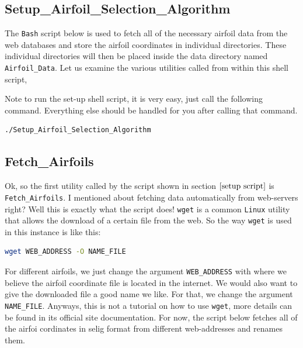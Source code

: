 \subsection{Setup\_Airfoil\_Selection\_Algorithm} \label{setup script}

The \texttt{Bash} script below is used to fetch all of the necessary airfoil data from the web databases and store the airfoil coordinates in individual directories. These individual directories will then be placed inside the data directory named \texttt{Airfoil\_Data}. Let us examine the various utilities called from within this shell script, 

$$$$
Note to run the set-up shell script, it is very easy, just call the following command. Everything else should be handled for you after calling that command.
\begin{lstlisting}
./Setup_Airfoil_Selection_Algorithm
\end{lstlisting}

\subsection{Fetch\_Airfoils}

Ok, so the first utility called by the script shown in section $\ref{setup script}$ is \texttt{Fetch\_Airfoils}. I mentioned about fetching data automatically from web-servers right? Well this is exactly what the script does! \texttt{wget} is a common \texttt{Linux} utility that allows the download of a certain file from the web. So the way \texttt{wget} is used in this instance is like this:
\begin{lstlisting}[language=Bash]
wget WEB_ADDRESS -O NAME_FILE
\end{lstlisting}
For different airfoils, we just change the argument \texttt{WEB\_ADDRESS} with where we believe the airfoil coordinate file is located in the internet. We would also want to give the downloaded file a good name we like. For that, we change the argument \texttt{NAME\_FILE}. Anyways, this is not a tutorial on how to use \texttt{wget}, more details can be found in its official site documentation. For now, the script below fetches all of the airfoi cordinates in selig format from different web-addresses and renames them.


